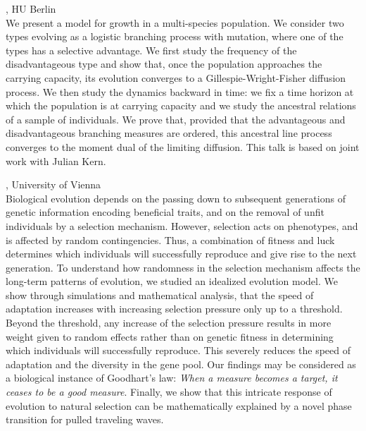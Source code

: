 \documentclass[12pt,a4paper]{article}
\begin{document}
, HU Berlin \\[2ex] We present a model for growth in a multi-species population. We consider two types evolving as a logistic branching process with mutation, where one of the types has a selective advantage. We first study the frequency of the disadvantageous type and show that, once the population approaches the carrying capacity, its evolution converges to a Gillespie-Wright-Fisher diffusion process. We then study the dynamics backward in time: we fix a time horizon at which the population is at carrying capacity and we study the ancestral relations of a sample of individuals. We prove that, provided that the advantageous and disadvantageous branching measures are ordered, this ancestral line process converges to the moment dual of the limiting diffusion. This talk is based on joint work with Julian Kern. 

\bigskip\bigskip

, University of Vienna \\[2ex] Biological evolution depends on the passing down to subsequent generations of genetic information encoding beneficial traits, and on the removal of unfit individuals by a selection mechanism. However, selection acts on phenotypes, and is affected by random contingencies. Thus, a combination of fitness and luck determines which individuals will successfully reproduce and give rise to the next generation. To understand how randomness in the selection mechanism affects the long-term patterns of evolution, we studied an idealized evolution model. We show through simulations and mathematical analysis, that the speed of adaptation increases with increasing selection pressure only up to a threshold. Beyond the threshold, any increase of the selection pressure results in more weight given to random effects rather than on genetic fitness in determining which individuals will successfully reproduce. This severely reduces the speed of adaptation and the diversity in the gene pool. Our findings may be considered as a biological instance of  Goodhart's law: {\em When a measure becomes a target, it ceases to be a good measure}. Finally, we show that this intricate response of evolution to natural selection can be mathematically explained by a novel phase transition for pulled traveling waves. 
\end{document}
